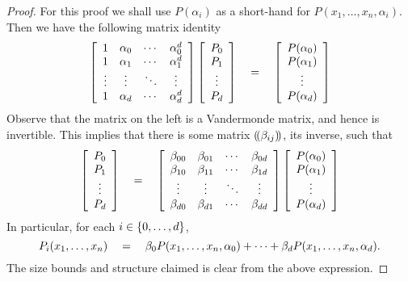 \begin{proof}
For this proof we shall use $P(\alpha_i)$ as a short-hand for $P(x_1,\ldots, x_n, \alpha_i)$. Then we have the following matrix identity
\[
\left[\begin{array}{cccc}
1 & \alpha_0 & \cdots & \alpha_0^d\\
1 & \alpha_1 & \cdots & \alpha_1^d\\
\vdots & \vdots & \ddots & \vdots\\
1 & \alpha_d & \cdots & \alpha_d^d
\end{array}\right] \left[\begin{array}{c}
P_0\\
P_1 \\
\vdots\\
P_d
\end{array}\right] \quad = \quad
\left[\begin{array}{c}
P(\alpha_0)\\
P(\alpha_1) \\
\vdots\\
P(\alpha_d)
\end{array}\right]
\]
Observe that the matrix on the left is a Vandermonde matrix, and hence is invertible. This implies that there is some matrix $\left(\!\left(\beta_{ij}\right)\!\right)$, its inverse, such that
\[
\left[\begin{array}{c}
P_0\\
P_1 \\
\vdots\\
P_d
\end{array}\right] \quad = \quad
\left[\begin{array}{cccc}
\beta_{00} & \beta_{01} & \cdots & \beta_{0d}\\
\beta_{10} & \beta_{11} & \cdots & \beta_{1d}\\
\vdots & \vdots & \ddots & \vdots\\
\beta_{d0} & \beta_{d1} & \cdots & \beta_{dd}
\end{array}\right] 
\left[\begin{array}{c}
P(\alpha_0)\\
P(\alpha_1) \\
\vdots\\
P(\alpha_d)
\end{array}\right]
\]
In particular, for each $i \in \left\{0,\ldots, d\right\}$,
\[
P_i(x_1,\ldots, x_n) \quad = \quad \beta_0 P(x_1,\ldots, x_n, \alpha_0) + \cdots + \beta_d P(x_1,\ldots, x_n, \alpha_d). 
\]
The size bounds and structure claimed is clear from the above expression.
\end{proof}

